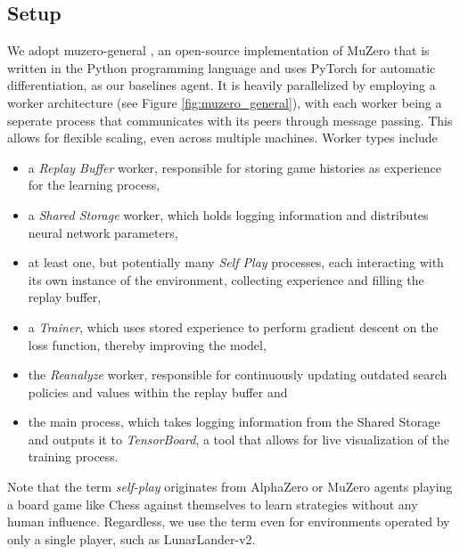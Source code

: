 \subsection{Setup}
We adopt muzero-general \cite{muzero-general}, an open-source implementation of MuZero that is written in the Python programming language and uses PyTorch for automatic differentiation, as our baselines agent. It is heavily parallelized by employing a worker architecture (see Figure \ref{fig:muzero_general}), with each worker being a seperate process that communicates with its peers through message passing. This allows for flexible scaling, even across multiple machines. Worker types include
\begin{itemize}
    \item a \textit{Replay Buffer} worker, responsible for storing game histories as experience for the learning process,
    \item a \textit{Shared Storage} worker, which holds logging information and distributes neural network parameters,
    \item at least one, but potentially many \textit{Self Play} processes, each interacting with its own instance of the environment, collecting experience and filling the replay buffer,
    \item a \textit{Trainer}, which uses stored experience to perform gradient descent on the loss function, thereby improving the model,
    \item the \textit{Reanalyze} worker, responsible for continuously updating outdated search policies and values within the replay buffer and
    \item the main process, which takes logging information from the Shared Storage and outputs it to \textit{TensorBoard}, a tool that allows for live visualization of the training process.
\end{itemize}
Note that the term \textit{self-play} originates from AlphaZero or MuZero agents playing a board game like Chess against themselves to learn strategies without any human influence. Regardless, we use the term even for environments operated by only a single player, such as LunarLander-v2.
